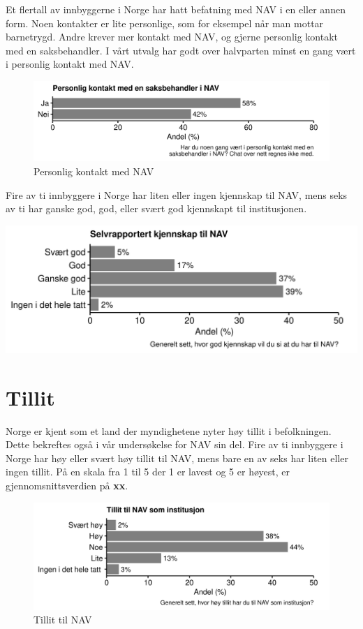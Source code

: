 \documentclass[
]{book}
\begin{document}
Et flertall av innbyggerne i Norge har hatt befatning med NAV i en eller annen form.
Noen kontakter er lite personlige, som for eksempel når man mottar barnetrygd.
Andre krever mer kontakt med NAV, og gjerne personlig kontakt med en saksbehandler.
I vårt utvalg har godt over halvparten minst en gang vært i personlig kontakt med NAV.

\begin{figure}
\centering
\includegraphics{figs/png/fig_nav_personal_contact.png}
\caption{Personlig kontakt med NAV}
\end{figure}

Fire av ti innbyggere i Norge har liten eller ingen kjennskap til NAV, mens seks av ti har ganske god, god, eller svært god kjennskapt til institusjonen.

\includegraphics{figs/png/fig_nav_knowledge.png}

\hypertarget{tillit}{%
\section{Tillit}\label{tillit}}

Norge er kjent som et land der myndighetene nyter høy tillit i befolkningen.
Dette bekreftes også i vår undersøkelse for NAV sin del.
Fire av ti innbyggere i Norge har høy eller svært høy tillit til NAV, mens bare en av seks har liten eller ingen tillit.
På en skala fra 1 til 5 der 1 er lavest og 5 er høyest, er gjennomsnittsverdien på \textbf{xx}.

\begin{figure}
\centering
\includegraphics{figs/png/fig_nav_trust.png}
\caption{Tillit til NAV}
\end{figure}
\end{document}
